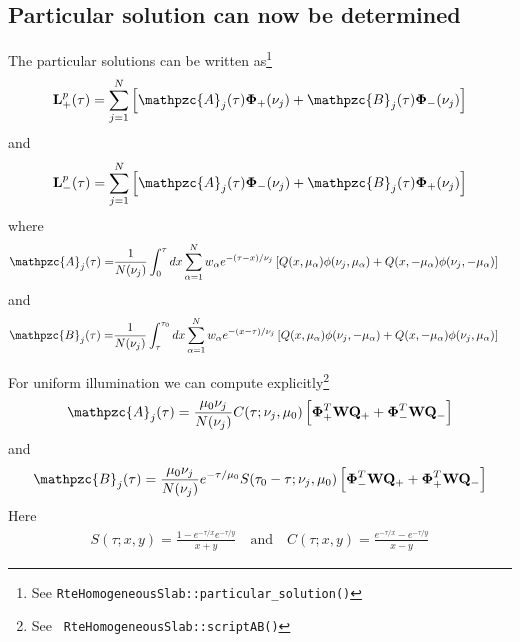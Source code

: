 \documentclass[11pt]{article}
\newcommand{\mvec}[1]{\mathbf{#1}}
\newcommand{\gvec}[1]{\boldsymbol{#1}}
\newcommand{\script}[1]{\mathpzc{#1}}
\begin{document}
\subsection{Particular solution can now be determined}
The particular solutions can be written as\footnote{See
  {\tt RteHomogeneousSlab::particular\_solution()}}
\begin{align}
  \mvec{L}^p_+(\tau) = \sum_{j=1}^N
  \left[
    \script{A}_j(\tau) \gvec{\Phi}_+(\nu_j) +
    \script{B}_j(\tau) \gvec{\Phi}_-(\nu_j)
  \right]
\end{align}
and
\begin{align}
  \mvec{L}^p_-(\tau) = \sum_{j=1}^N
  \left[
    \script{A}_j(\tau) \gvec{\Phi}_-(\nu_j) +
    \script{B}_j(\tau) \gvec{\Phi}_+(\nu_j)
  \right]
\end{align}
where
\begin{align}
  \script{A}_j(\tau) = &\frac{1}{N(\nu_j)}
  \int_0^\tau dx
  \sum_{\alpha=1}^N w_\alpha e^{-(\tau-x)/\nu_j}
  \left[
    Q(x,\mu_\alpha)\phi(\nu_j,\mu_\alpha) +
    Q(x,-\mu_\alpha)\phi(\nu_j,-\mu_\alpha)
  \right]
\end{align}
and
\begin{align}
  \script{B}_j(\tau) = &\frac{1}{N(\nu_j)}
  \int_\tau^{\tau_0} dx
  \sum_{\alpha=1}^N w_\alpha e^{-(x-\tau)/\nu_j}
  \left[
    Q(x,\mu_\alpha)\phi(\nu_j,-\mu_\alpha) +
    Q(x,-\mu_\alpha)\phi(\nu_j,\mu_\alpha)
  \right]
\end{align}


For uniform illumination we can compute explicitly\footnote{See {\tt
    RteHomogeneousSlab::scriptAB()}}
\begin{align}
  \script{A}_j(\tau) = \frac{\mu_0 \nu_j}{N(\nu_j)}
  C(\tau ; \nu_j, \mu_0)
  \left[
    \gvec{\Phi}_+^T \mvec{W} \mvec{Q}_+ +
    \gvec{\Phi}_-^T \mvec{W} \mvec{Q}_-
  \right]
\end{align}
and
\begin{align}
  \script{B}_j(\tau) = \frac{\mu_0 \nu_j}{N(\nu_j)}
  e^{-\tau/\mu_0}S(\tau_0-\tau ; \nu_j, \mu_0)
  \left[
    \gvec{\Phi}_-^T \mvec{W} \mvec{Q}_+ +
    \gvec{\Phi}_+^T \mvec{W} \mvec{Q}_-
  \right]
\end{align}
Here
\begin{align}
  S(\tau;x,y) = \frac{1-e^{-\tau/x}e^{-\tau/y}}{x+y} \quad\textrm{and}\quad
  C(\tau;x,y) = \frac{e^{-\tau/x}-e^{-\tau/y}}{x-y}
\end{align}
\end{document}
